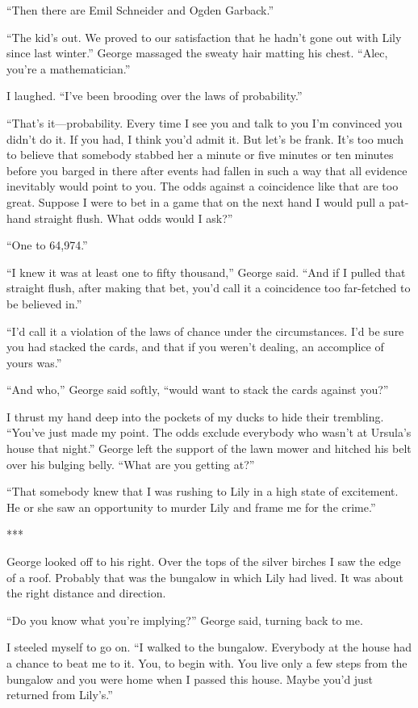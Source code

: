 \documentclass{novel}
\begin{document}
“Then there are Emil Schneider and Ogden Garback.”

“The kid’s out. We proved to our satisfaction that he hadn’t gone out with Lily since last winter.” George massaged the sweaty hair matting his chest. “Alec, you’re a mathematician.”

I laughed. “I’ve been brooding over the laws of probability.”

“That’s it—probability. Every time I see you and talk to you I’m convinced you didn’t do it. If you had, I think you’d admit it. But let’s be frank. It’s too much to believe that somebody stabbed her a minute or five minutes or ten minutes before you barged in there after events had fallen in such a way that all evidence inevitably would point to you. The odds against a coincidence like that are too great. Suppose I were to bet in a game that on the next hand I would pull a pat-hand straight flush. What odds would I ask?”

“One to 64,974.”

“I knew it was at least one to fifty thousand,” George said. “And if I pulled that straight flush, after making that bet, you’d call it a coincidence too far-fetched to be believed in.”

“I’d call it a violation of the laws of chance under the circumstances. I’d be sure you had stacked the cards, and that if you weren’t dealing, an accomplice of yours was.”

“And who,” George said softly, “would want to stack the cards against you?”

I thrust my hand deep into the pockets of my ducks to hide their trembling. “You’ve just made my point. The odds exclude everybody who wasn’t at Ursula’s house that night.” George left the support of the lawn mower and hitched his belt over his bulging belly. “What are you getting at?”

“That somebody knew that I was rushing to Lily in a high state of excitement. He or she saw an opportunity to murder Lily and frame me for the crime.”

***

George looked off to his right. Over the tops of the silver birches I saw the edge of a roof. Probably that was the bungalow in which Lily had lived. It was about the right distance and direction.

“Do you know what you’re implying?” George said, turning back to me.

I steeled myself to go on. “I walked to the bungalow. Everybody at the house had a chance to beat me to it. You, to begin with. You live only a few steps from the bungalow and you were home when I passed this house. Maybe you’d just returned from Lily’s.”
\end{document}
